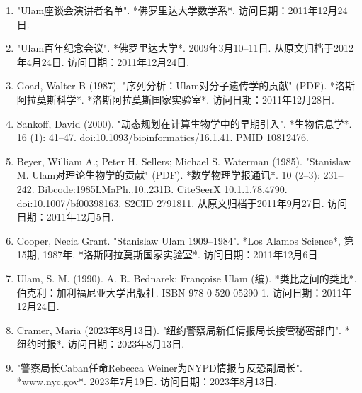 \begin{enumerate}
\item "Ulam座谈会演讲者名单". *佛罗里达大学数学系*. 访问日期：2011年12月24日.
\item "Ulam百年纪念会议". *佛罗里达大学*. 2009年3月10–11日. 从原文归档于2012年4月24日. 访问日期：2011年12月24日.
\item Goad, Walter B (1987). "序列分析：Ulam对分子遗传学的贡献" (PDF). *洛斯阿拉莫斯科学*. *洛斯阿拉莫斯国家实验室*. 访问日期：2011年12月28日.
\item Sankoff, David (2000). "动态规划在计算生物学中的早期引入". *生物信息学*. 16 (1): 41–47. doi:10.1093/bioinformatics/16.1.41. PMID 10812476.
\item Beyer, William A.; Peter H. Sellers; Michael S. Waterman (1985). "Stanislaw M. Ulam对理论生物学的贡献" (PDF). *数学物理学报通讯*. 10 (2–3): 231–242. Bibcode:1985LMaPh..10..231B. CiteSeerX 10.1.1.78.4790. doi:10.1007/bf00398163. S2CID 2791811. 从原文归档于2011年9月27日. 访问日期：2011年12月5日.
\item Cooper, Necia Grant. "Stanislaw Ulam 1909–1984". *Los Alamos Science*, 第15期, 1987年. *洛斯阿拉莫斯国家实验室*. 访问日期：2011年12月6日.
\item Ulam, S. M. (1990). A. R. Bednarek; Françoise Ulam (编). *类比之间的类比*. 伯克利：加利福尼亚大学出版社. ISBN 978-0-520-05290-1. 访问日期：2011年12月24日.
\item Cramer, Maria (2023年8月13日). "纽约警察局新任情报局长接管秘密部门". *纽约时报*. 访问日期：2023年8月13日.
\item "警察局长Caban任命Rebecca Weiner为NYPD情报与反恐副局长". *www.nyc.gov*. 2023年7月19日. 访问日期：2023年8月13日.
\end{enumerate}